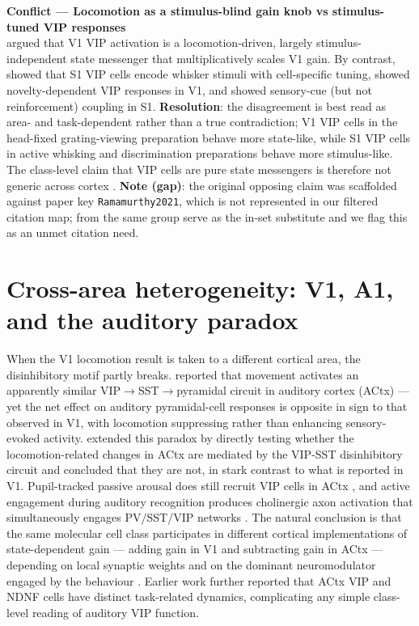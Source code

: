 \documentclass[11pt]{article}
\let\origrightarrow\rightarrow
\def\rightarrow{\ensuremath{\origrightarrow}}
\begin{document}
\begin{framed}
\textbf{Conflict --- Locomotion as a stimulus-blind gain knob vs stimulus-tuned VIP responses}\\
\citet{Fu2014} argued that V1 VIP activation is a locomotion-driven, largely stimulus-independent state messenger that multiplicatively scales V1 gain. By contrast, \citet{Yu2019} showed that S1 VIP cells encode whisker stimuli with cell-specific tuning, \citet{Garrett2020} showed novelty-dependent VIP responses in V1, and \citet{Ramamurthy2023} showed sensory-cue (but not reinforcement) coupling in S1. \textbf{Resolution}: the disagreement is best read as area- and task-dependent rather than a true contradiction; V1 VIP cells in the head-fixed grating-viewing preparation behave more state-like, while S1 VIP cells in active whisking and discrimination preparations behave more stimulus-like. The class-level claim that VIP cells are pure state messengers is therefore not generic across cortex \citep{Mesik2015, Millman2020, Bastos2023a}. \textbf{Note (gap)}: the original opposing claim was scaffolded against paper key \texttt{Ramamurthy2021}, which is not represented in our filtered citation map; \citet{Ramamurthy2023, Ramamurthy2025} from the same group serve as the in-set substitute and we flag this as an unmet citation need.
\end{framed}

\section{Cross-area heterogeneity: V1, A1, and the auditory paradox}

When the V1 locomotion result is taken to a different cortical area, the disinhibitory motif partly breaks. \citet{Bigelow2019} reported that movement activates an apparently similar VIP\rightarrow SST\rightarrow pyramidal circuit in auditory cortex (ACtx) --- yet the net effect on auditory pyramidal-cell responses is opposite in sign to that observed in V1, with locomotion suppressing rather than enhancing sensory-evoked activity. \citet{Yavorska2021} extended this paradox by directly testing whether the locomotion-related changes in ACtx are mediated by the VIP-SST disinhibitory circuit and concluded that they are not, in stark contrast to what is reported in V1. Pupil-tracked passive arousal does still recruit VIP cells in ACtx \citep{Reimer2014, Munoz2017}, and active engagement during auditory recognition produces cholinergic axon activation that simultaneously engages PV/SST/VIP networks \citep{Kuchibhotla2017}. The natural conclusion is that the same molecular cell class participates in different cortical implementations of state-dependent gain --- adding gain in V1 and subtracting gain in ACtx --- depending on local synaptic weights and on the dominant neuromodulator engaged by the behaviour \citep{Bigelow2019, Yavorska2021, Lecrux2016}. Earlier work \citep{Moore2026} further reported that ACtx VIP and NDNF cells have distinct task-related dynamics, complicating any simple class-level reading of auditory VIP function.
\end{document}
